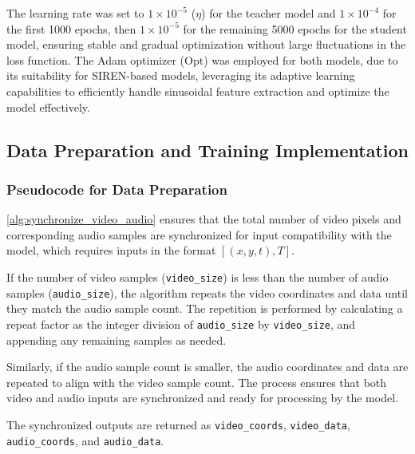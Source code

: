 \documentclass{ioereport}
\begin{document}
The learning rate was set to $1 \times 10^{-5}$ ($\eta$) for the teacher model and $1 \times 10^{-4}$ for the first 1000 epochs, then $1 \times 10^{-5}$ for the remaining 5000 epochs for the student model, ensuring stable and gradual optimization without large fluctuations in the loss function. The Adam optimizer ($\text{Opt}$) was employed for both models, due to its suitability for SIREN-based models, leveraging its adaptive learning capabilities to efficiently handle sinusoidal feature extraction and optimize the model effectively.

\pagebreak

\subsection{Data Preparation and Training Implementation}

\subsubsection{Pseudocode for Data Preparation}

\autoref{alg:synchronize_video_audio} ensures that the total number of video pixels and corresponding audio samples are synchronized for input compatibility with the model, which requires inputs in the format \([(x, y, t), T]\). 

If the number of video samples (\texttt{video\_size}) is less than the number of audio samples (\texttt{audio\_size}), the algorithm repeats the video coordinates and data until they match the audio sample count. The repetition is performed by calculating a repeat factor as the integer division of \texttt{audio\_size} by \texttt{video\_size}, and appending any remaining samples as needed. 

Similarly, if the audio sample count is smaller, the audio coordinates and data are repeated to align with the video sample count. The process ensures that both video and audio inputs are synchronized and ready for processing by the model.

The synchronized outputs are returned as \texttt{video\_coords}, \texttt{video\_data}, \texttt{audio\_coords}, and \texttt{audio\_data}.
\end{document}
